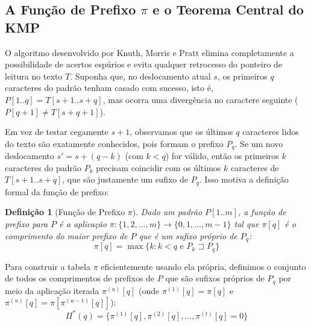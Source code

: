 \documentclass[12pt,a4paper]{article}
\newtheorem{definicao}{Defini\c{c}\~ao}[section]
\begin{document}
\subsection{A Fun\c{c}\~ao de Prefixo $\pi$ e o Teorema Central do KMP}

O algoritmo desenvolvido por Knuth, Morris e Pratt \cite{knuth1977} elimina completamente a possibilidade de acertos esp\'urios e evita qualquer retrocesso do ponteiro de leitura no texto $T$. Suponha que, no deslocamento atual $s$, os primeiros $q$ caracteres do padr\~ao tenham casado com sucesso, isto \'e, $P[1..q] = T[s+1..s+q]$, mas ocorra uma diverg\^encia no caractere seguinte ($P[q+1] \neq T[s+q+1]$).

Em vez de testar cegamente $s+1$, observamos que os \'ultimos $q$ caracteres lidos do texto s\~ao exatamente conhecidos, pois formam o prefixo $P_q$. Se um novo deslocamento $s' = s + (q - k)$ (com $k < q$) for v\'alido, ent\~ao os primeiros $k$ caracteres do padr\~ao $P_k$ precisam coincidir com os \'ultimos $k$ caracteres de $T[s+1..s+q]$, que s\~ao justamente um sufixo de $P_q$. Isso motiva a defini\c{c}\~ao formal da fun\c{c}\~ao de prefixo:

\begin{definicao}[Fun\c{c}\~ao de Prefixo $\pi$]
Dado um padr\~ao $P[1..m]$, a fun\c{c}\~ao de prefixo para $P$ \'e a aplica\c{c}\~ao $\pi : \{1, 2, \dots, m\} \to \{0, 1, \dots, m-1\}$ tal que $\pi[q]$ \'e o comprimento do maior prefixo de $P$ que \'e um sufixo pr\'oprio de $P_q$:
\begin{equation}
    \pi[q] = \max \{ k : k < q \text{ e } P_k \sqsupset P_q \}
\end{equation}
\end{definicao}

Para construir a tabela $\pi$ eficientemente usando ela pr\'opria, definimos o conjunto de todos os comprimentos de prefixos de $P$ que s\~ao sufixos pr\'oprios de $P_q$ por meio da aplica\c{c}\~ao iterada $\pi^{(u)}[q]$ (onde $\pi^{(1)}[q] = \pi[q]$ e $\pi^{(u)}[q] = \pi[\pi^{(u-1)}[q]]$):
\begin{equation}
    \Pi^*(q) = \big\{ \pi^{(1)}[q], \pi^{(2)}[q], \dots, \pi^{(t)}[q] = 0 \big\}
\end{equation}
\end{document}
